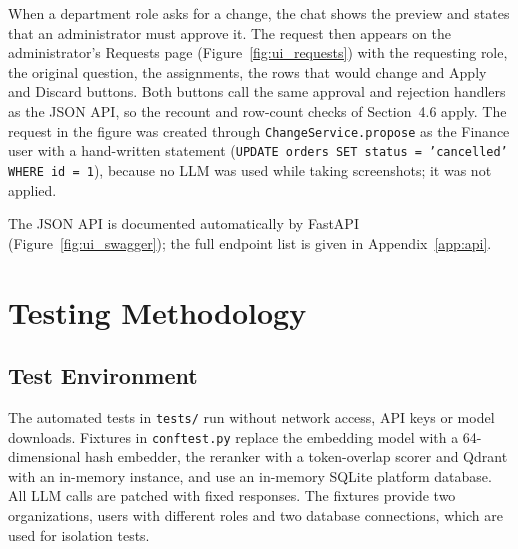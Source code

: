 \begin{figure}[H]
    \centering
    \hfill
\end{figure}

When a department role asks for a change, the chat shows the preview and states that an
administrator must approve it. The request then appears on the administrator's Requests page
(Figure~\ref{fig:ui_requests}) with the requesting role, the original question, the
assignments, the rows that would change and Apply and Discard buttons. Both buttons call
the same approval and rejection handlers as the JSON API, so the recount and row-count
checks of Section~4.6 apply. The request in the figure was created through
\texttt{ChangeService.propose} as the Finance user with a hand-written statement
(\texttt{UPDATE orders SET status = 'cancelled' WHERE id = 1}), because no LLM was used
while taking screenshots; it was not applied.

\begin{figure}[H]
    \centering
\end{figure}

The JSON API is documented automatically by FastAPI (Figure~\ref{fig:ui_swagger}); the full
endpoint list is given in Appendix~\ref{app:api}.

\begin{figure}[H]
    \centering
\end{figure}

\section{Testing Methodology}

\subsection{Test Environment}
The automated tests in \texttt{tests/} run without network access, API keys or model
downloads. Fixtures in \texttt{conftest.py} replace the embedding model with a
64-dimensional hash embedder, the reranker with a token-overlap scorer and Qdrant with an
in-memory instance, and use an in-memory SQLite platform database. All LLM calls are
patched with fixed responses. The fixtures provide two organizations, users with different
roles and two database connections, which are used for isolation tests.

